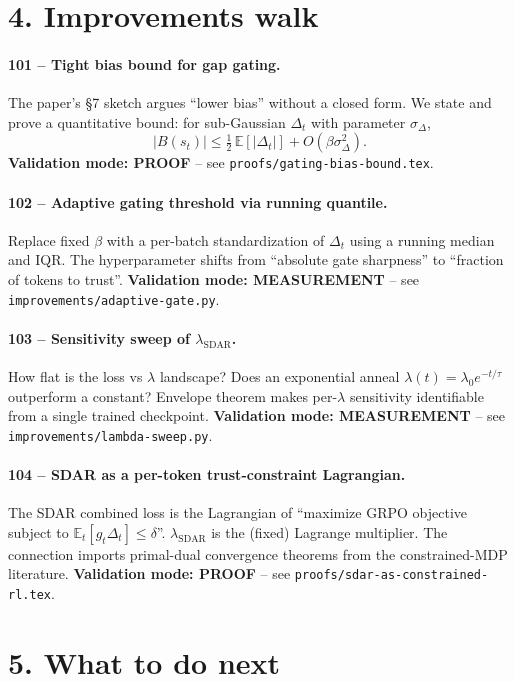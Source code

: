 \documentclass[11pt]{article}
\begin{document}
\section*{4. Improvements walk}

\paragraph{101 -- Tight bias bound for gap gating.} The paper's \S7 sketch argues ``lower bias'' without a closed form. We state and prove a quantitative bound: for sub-Gaussian $\Delta_t$ with parameter $\sigma_\Delta$,
\[
|B(s_t)| \leq \tfrac{1}{2}\,\mathbb{E}[|\Delta_t|] + O(\beta \sigma_\Delta^2).
\]
\textbf{Validation mode: PROOF} -- see \texttt{proofs/gating-bias-bound.tex}.

\paragraph{102 -- Adaptive gating threshold via running quantile.} Replace fixed $\beta$ with a per-batch standardization of $\Delta_t$ using a running median and IQR. The hyperparameter shifts from ``absolute gate sharpness'' to ``fraction of tokens to trust''. \textbf{Validation mode: MEASUREMENT} -- see \texttt{improvements/adaptive-gate.py}.

\paragraph{103 -- Sensitivity sweep of $\lambda_{\mathrm{SDAR}}$.} How flat is the loss vs $\lambda$ landscape? Does an exponential anneal $\lambda(t) = \lambda_0 e^{-t/\tau}$ outperform a constant? Envelope theorem makes per-$\lambda$ sensitivity identifiable from a single trained checkpoint. \textbf{Validation mode: MEASUREMENT} -- see \texttt{improvements/lambda-sweep.py}.

\paragraph{104 -- SDAR as a per-token trust-constraint Lagrangian.} The SDAR combined loss is the Lagrangian of ``maximize GRPO objective subject to $\mathbb{E}_t[g_t \Delta_t] \leq \delta$''. $\lambda_{\mathrm{SDAR}}$ is the (fixed) Lagrange multiplier. The connection imports primal-dual convergence theorems from the constrained-MDP literature. \textbf{Validation mode: PROOF} -- see \texttt{proofs/sdar-as-constrained-rl.tex}.

\section*{5. What to do next}
\end{document}
